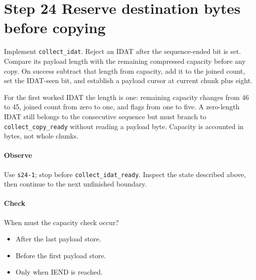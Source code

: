 \section{Step 24 Reserve destination bytes before copying}\label{png-collect-s24}
Implement \texttt{collect\_idat}. Reject an IDAT after the sequence-ended bit is set. Compare its payload length with the remaining compressed capacity before any copy. On success subtract that length from capacity, add it to the joined count, set the IDAT-seen bit, and establish a payload cursor at current chunk plus eight.

For the first worked IDAT the length is one: remaining capacity changes from 46 to 45, joined count from zero to one, and flags from one to five. A zero-length IDAT still belongs to the consecutive sequence but must branch to \texttt{collect\_copy\_ready} without reading a payload byte. Capacity is accounted in bytes, not whole chunks.

\paragraph{Observe} Use \texttt{s24-1}; stop before \texttt{collect\_idat\_ready}. Inspect the state described above, then continue to the next unfinished boundary.

\paragraph{Check} When must the capacity check occur?
\begin{itemize}
  \item[A.] After the last payload store.
  \item[B.] Before the first payload store.
  \item[C.] Only when IEND is reached.
\end{itemize}
